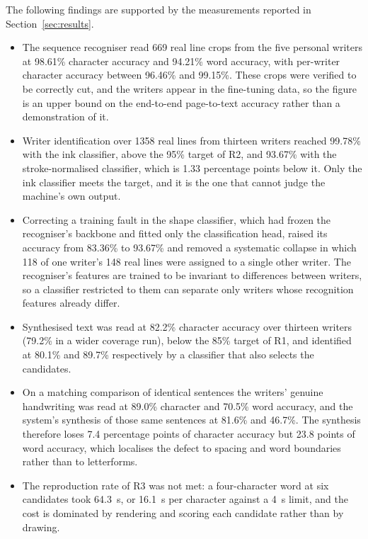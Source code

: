 The following findings are supported by the measurements reported in Section~\ref{sec:results}.
\begin{itemize}
  \item The sequence recogniser read 669 real line crops from the five personal writers at 98.61\% character accuracy and 94.21\% word accuracy, with per-writer character accuracy between 96.46\% and 99.15\%. These crops were verified to be correctly cut, and the writers appear in the fine-tuning data, so the figure is an upper bound on the end-to-end page-to-text accuracy rather than a demonstration of it.
  \item Writer identification over 1358 real lines from thirteen writers reached 99.78\% with the ink classifier, above the 95\% target of R2, and 93.67\% with the stroke-normalised classifier, which is 1.33 percentage points below it. Only the ink classifier meets the target, and it is the one that cannot judge the machine's own output.
  \item Correcting a training fault in the shape classifier, which had frozen the recogniser's backbone and fitted only the classification head, raised its accuracy from 83.36\% to 93.67\% and removed a systematic collapse in which 118 of one writer's 148 real lines were assigned to a single other writer. The recogniser's features are trained to be invariant to differences between writers, so a classifier restricted to them can separate only writers whose recognition features already differ.
  \item Synthesised text was read at 82.2\% character accuracy over thirteen writers (79.2\% in a wider coverage run), below the 85\% target of R1, and identified at 80.1\% and 89.7\% respectively by a classifier that also selects the candidates.
  \item On a matching comparison of identical sentences the writers' genuine handwriting was read at 89.0\% character and 70.5\% word accuracy, and the system's synthesis of those same sentences at 81.6\% and 46.7\%. The synthesis therefore loses 7.4 percentage points of character accuracy but 23.8 points of word accuracy, which localises the defect to spacing and word boundaries rather than to letterforms.
  \item The reproduction rate of R3 was not met: a four-character word at six candidates took 64.3~s, or 16.1~s per character against a 4~s limit, and the cost is dominated by rendering and scoring each candidate rather than by drawing.

\end{itemize}
